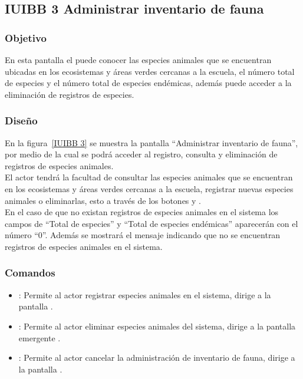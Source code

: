 \subsection{IUIBB 3 Administrar inventario de fauna}

\subsubsection{Objetivo}

    En esta pantalla el  puede conocer las especies animales que se encuentran ubicadas en los ecosistemas y áreas verdes cercanas a la escuela, el número total de especies y el número total de especies endémicas, además puede acceder a la eliminación de registros de especies.

\subsubsection{Diseño}

    En la figura~\ref{IUIBB 3} se muestra la pantalla ``Administrar inventario de fauna'', por medio de la cual se podrá acceder al registro, consulta y eliminación de registros de especies animales.\\
    
    El actor tendrá la facultad de consultar las especies animales que se encuentran en los ecosistemas y áreas verdes cercanas a la escuela, registrar nuevas especies animales o eliminarlas, esto a través de los botones  y \botKo.\\
    
    En el caso de que no existan registros de especies animales en el sistema los campos de ``Total de especies'' y ``Total de especies endémicas'' aparecerán con el número ``0''. Además se mostrará el mensaje  indicando que no se encuentran registros de especies animales en el sistema.



\subsubsection{Comandos}
    \begin{itemize}
	\item {}: Permite al actor registrar especies animales en el sistema, dirige a la pantalla .
	
	\item \botKo[Eliminar]: Permite al actor eliminar especies animales del sistema, dirige a la pantalla emergente .
	
	\item {}: Permite al actor cancelar la administración de inventario de fauna, dirige a la pantalla .
    \end{itemize}

